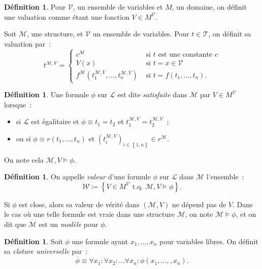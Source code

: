 \documentclass{article}
\theoremstyle{definition}
\newtheorem{déf}[thm]{Définition}
\theoremstyle{remark}
\newcommand{\intint}[2]{\left\llbracket#1, #2\right\rrbracket}
\newcommand{\tq}{\text{ t.q. }}
\begin{document}
	\begin{déf} Pour $\mathcal V$, un ensemble de variables et $M$, un domaine, on définit une valuation comme étant une fonction $V \in M^{\mathcal V}$.

	Soit $\mathcal M$, une structure, et $\mathcal V$ un ensemble de variables. Pour $t \in \mathcal T$, on définit sa valuation par~:
	\[t^{\mathcal M,V} = \begin{cases}
		c^{\mathcal M} &\text{ si $t$ est une constante $c$} \\
		V(x) &\text{ si } t=x \in \mathcal V\\
		f^{\mathcal M}(t_1^{\mathcal M,V}, \ldots, t_n^{\mathcal M,V}) &\text{ si } t = f(t_1, \ldots, t_n).
		\end{cases}\]
	\end{déf}

	\begin{déf} Une formule $\phi$ sur $\mathcal L$ est dite \textit{satisfaite} dans $\mathcal M$ par $V \in M^{\mathcal V}$ lorsque~:
	\begin{itemize}
		\item si $\mathcal L$ est égalitaire et $\phi \equiv t_1 = t_2$ et $t_1^{\mathcal M,V}=t_2^{\mathcal M,V}$~;
		\item ou si $\phi \equiv r(t_1, \ldots, t_n)$ et $(t_i^{\mathcal M,V})_{i \in \intint 1n} \in r^{\mathcal M}$.
	\end{itemize}
	On note cela $\mathcal M,V \models \phi$.
	\end{déf}

	\begin{déf} On appelle \textit{valeur} d'une formule $\phi$ sur $\mathcal L$ dans $\mathcal M$ l'ensemble~:
	\[\mathcal W \coloneqq \left\{V \in M^{\mathcal V} \tq \mathcal M,V \models \phi\right\}.\]
	\end{déf}

	Si $\phi$ est close, alors sa valeur de vérité dans $(\mathcal M, V)$ ne dépend pas de $V$. Dans le cas où une telle formule est vraie dans
	une structure $\mathcal M$, on note $\mathcal M \models \phi$, et on dit que $\mathcal M$ est un \textit{modèle} pour $\phi$.

	\begin{déf} Soit $\phi$ une formule ayant $x_1, \ldots, x_n$ pour variables libres. On définit sa \textit{cloture universelle} par~:
	\[\overline \phi \equiv \forall x_1 : \forall x_2 : \ldots \forall x_n : \phi(x_1, \ldots, ,x_n).\]
	\end{déf}
\end{document}
